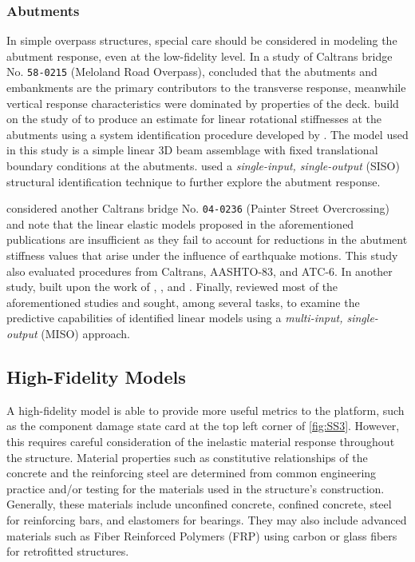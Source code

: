 \subsubsection*{Abutments}
In simple overpass structures, special care should be considered in modeling the abutment response, even at the low-fidelity level.
In a study of Caltrans bridge No. \texttt{58-0215} (Meloland Road Overpass), \cite{werner1987seismic} concluded that the abutments and embankments
are the primary contributors to the transverse response, meanwhile
vertical response characteristics were dominated by properties of the
deck.
\textcite{levine1989dynamic} build on the study of
\cite{werner1987seismic} to produce an estimate for linear
rotational stiffnesses at the abutments using a system identification
procedure developed by \textcite{beck1978determining} . 
The model used in this study
is a simple linear 3D beam assemblage with fixed translational
boundary conditions at the abutments.
\textcite{wilson1990bridge} used a \emph{single-input, single-output} (SISO)
structural identification technique to further explore the abutment
response.

\textcite{goel1997evaluation} considered another Caltrans bridge No. \texttt{04-0236} (Painter Street Overcrossing) 
and note that the linear elastic models proposed in the
aforementioned publications are insufficient as they fail to account for
reductions in the abutment stiffness values that arise under the influence of
earthquake motions. This study also evaluated procedures from
Caltrans, AASHTO-83, and ATC-6. 
In another study, 
\textcite{zhang2002seismic} built upon the work of
\textcite{wilson1990bridge}, \cite{werner1987seismic}, and
\textcite{goel1997evaluation}.
%
Finally, \textcite{arici2003system} reviewed most of the aforementioned studies
and sought, among several tasks, to examine the predictive capabilities
of identified linear models using a \emph{multi-input, single-output} (MISO)
 approach.
%
%
%
\subsection{High-Fidelity Models}
A high-fidelity model is able to provide more useful metrics to the \gls{platform}, such as the component damage state card at the top left corner of \cref{fig:SS3}. However, this requires careful
consideration of the inelastic material response throughout the
 structure. 
Material properties such as constitutive relationships of the concrete and the reinforcing steel are determined from common engineering practice and/or testing for the materials used in the structure's construction. 
Generally, these materials include unconfined concrete, confined concrete, steel for reinforcing bars, and elastomers for bearings. They may also include advanced materials such as Fiber Reinforced Polymers (FRP) using carbon or glass fibers for retrofitted structures.

